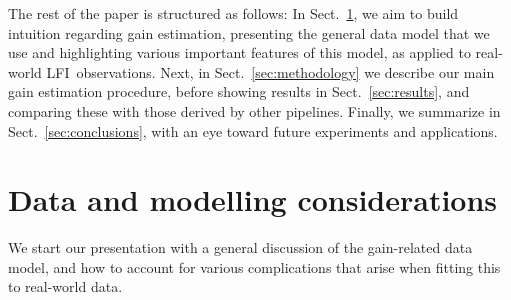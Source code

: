 \documentclass[twocolumn]{aa}
\newcommand{\lfi}[0]{LFI}
\begin{document}
The rest of the paper is structured as follows: In Sect.~\ref{sec:intuition}, we aim to build intuition regarding gain estimation, presenting the general data model that we use and highlighting various important features of this model, as applied to real-world \lfi\ observations. Next, in Sect.~\ref{sec:methodology} we describe our main gain estimation procedure, before showing results in Sect.~\ref{sec:results}, and comparing these with those derived by other pipelines. Finally, we summarize in Sect.~\ref{sec:conclusions}, with an eye toward future experiments and applications.

\section{Data and modelling considerations}
\label{sec:intuition}

We start our presentation with a general discussion of the
gain-related data model, and how to account for various complications
that arise when fitting this to real-world data.
\end{document}

